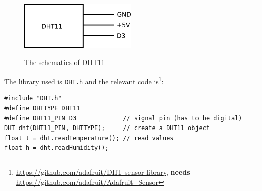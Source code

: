 \begin{figure} 
\caption{The schematics of DHT11}
\centering
\includegraphics[width=0.5\textwidth]{latex/img/dht_scheme.png}\label{img:dht_scheme}
\end{figure}
  
The library used is \texttt{DHT.h} and the relevant code is\footnote{\url{https://github.com/adafruit/DHT-sensor-library}, \textbf{needs} \url{https://github.com/adafruit/Adafruit_Sensor}}:

\begin{lstlisting}
#include "DHT.h"
#define DHTTYPE DHT11
#define DHT11_PIN D3             // signal pin (has to be digital)
DHT dht(DHT11_PIN, DHTTYPE);     // create a DHT11 object
float t = dht.readTemperature(); // read values
float h = dht.readHumidity();
\end{lstlisting}









